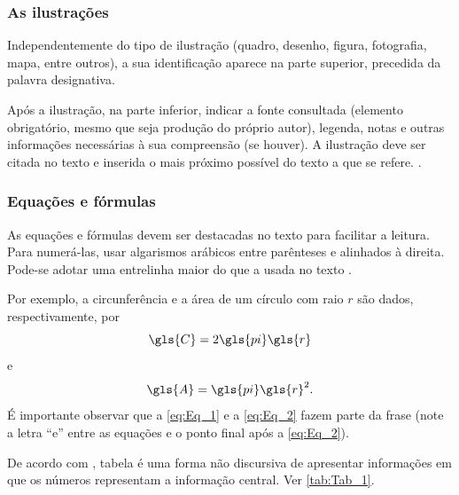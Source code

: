\subsubsection{As ilustrações}

Independentemente do tipo de ilustração (quadro, desenho, figura, fotografia, mapa, entre outros), a sua identificação aparece na parte superior, precedida da palavra designativa. 

\begin{citacao}
	Após a ilustração, na parte inferior, indicar a fonte consultada (elemento obrigatório, mesmo que seja produção do próprio autor), legenda, notas e outras informações necessárias à sua compreensão (se houver). A ilustração deve ser citada no texto e inserida o mais próximo possível do texto a que se refere. \cite[p. 11]{NBR14724:2011}.
\end{citacao}

\subsubsection{Equações e fórmulas}

As equações e fórmulas devem ser destacadas no texto para facilitar a leitura.  Para numerá-las, usar algarismos arábicos entre parênteses e alinhados à direita. Pode-se adotar uma entrelinha maior do que a usada no texto \cite{NBR14724:2011}.

Por exemplo, a circunferência e a área de um círculo com raio $r$ são dados, respectivamente, por
\begin{equation}\label{eq:Eq_1}
\gls{C} = 2 \gls{pi} \gls{r}    %
\end{equation}
e
\begin{equation}\label{eq:Eq_2}
\gls{A} = \gls{pi} \gls{r}^2.
\end{equation}
É importante observar que a \autoref{eq:Eq_1} e a \autoref{eq:Eq_2} fazem parte da frase (note a letra ``e'' entre as equações e o ponto final após a \autoref{eq:Eq_2}). 


De acordo com \textcite{ibge1993}, tabela é uma forma não discursiva de apresentar informações em que os números representam a informação central. Ver \autoref{tab:Tab_1}.

